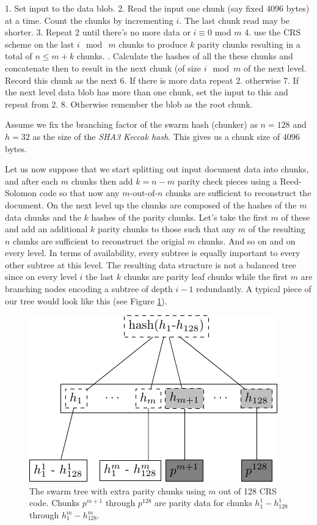 \documentclass[12pt]{article}
\begin{document}
 1. Set input to the data blob.
 2. Read the input one chunk (say fixed 4096 bytes) at a time. Count the chunks by incrementing $i$. The last chunk read may be shorter.
 3. Repeat 2 until there's no more data or $i \equiv 0$ mod $m$
 4. use the CRS scheme on the last $i \mod\ m$ chunks to produce $k$ parity chunks resulting in a total of $n \leq m+k$ chunks.
 . Calculate the hashes of all the these chunks and concatenate then to result in the next chunk (of size $i\mod m$ of the next level. Record this chunk as the next
 6. If there is more data repeat 2. otherwise
 7. If the next level data blob has more than one chunk, set the input to this and  repeat from 2.
 8. Otherwise remember the blob as the root chunk.

Assume we fix the branching factor of the swarm hash (chunker) as $n=128$ and $h=32$ as the size of the \emph{SHA3 Keccak hash}. This gives us a chunk size of $4096$ bytes.

Let us now suppose that we start splitting out input document data into chunks, and after each $m$ chunks then add $k=n-m$ parity check pieces using a Reed-Solomon code so that now any $m\text{-out-of-}n$ chunks are
sufficient to reconstruct the document. On the next level up the chunks are composed of the hashes of the $m$  data chunks and the $k$ hashes of the parity chunks. Let's take the first $m$
of these and add an additional $k$ parity chunks to those such that any $m$ of the resulting $n$
chunks are sufficient to reconstruct the origial $m$ chunks. And so on and on every level. In terms of
availability, every subtree is equally important to every other subtree at this level. The resulting
data structure is not a balanced tree since on every level $i$ the last $k$ chunks are parity leaf
chunks while the first $m$ are branching nodes encoding a subtree of depth $i-1$ redundantly.
A typical piece of our tree would look like this (see Figure \ref{fig:tree-with-erasure}).


\begin{figure}[htbp]
   \centering
   \includegraphics{fig/tree-with-erasure.pdf} %
   \caption{The swarm tree with extra parity chunks using $m$ out of 128 CRS code. Chunks $p^{m+1}$ through $p^{128}$ are parity data for chunks $h^1_1 - h^1_{128}$ through $h^{m}_1  - h^{m}_{128}$.}
   \label{fig:tree-with-erasure}
\end{figure}
\end{document}
